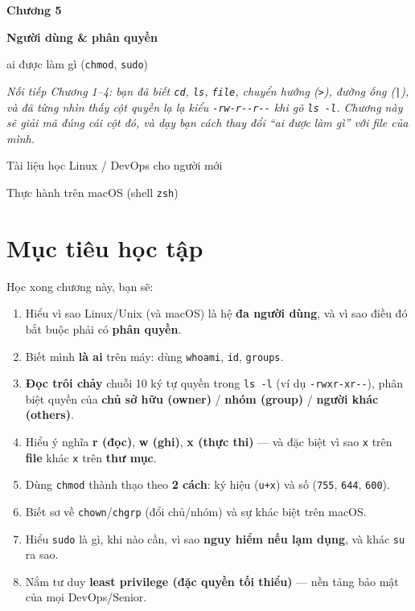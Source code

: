 \documentclass[12pt,a4paper]{article}
\newcommand{\cmd}[1]{\texttt{#1}}
\begin{document}
\begin{titlepage}
\centering
\vspace*{3cm}
{\Huge\bfseries\color{labcolor!80!black} Chương 5\par}
\vspace{1cm}
{\LARGE\bfseries Người dùng \& phân quyền\par}
\vspace{0.4cm}
{\Large ai được làm gì (\texttt{chmod}, \texttt{sudo})\par}
\vspace{2cm}
\begin{tcolorbox}[colback=labbg,colframe=labcolor,width=0.85\textwidth,arc=3mm,boxrule=0.8pt]
\itshape
Nối tiếp Chương 1--4: bạn đã biết \cmd{cd}, \cmd{ls}, \cmd{file}, chuyển hướng
(\cmd{>}), đường ống (\cmd{|}), và đã từng nhìn thấy cột quyền lạ lạ kiểu
\cmd{-rw-r-{}-r-{}-} khi gõ \cmd{ls -l}. Chương này sẽ giải mã đúng cái cột đó,
và dạy bạn cách thay đổi ``ai được làm gì'' với file của mình.
\end{tcolorbox}
\vfill
{\large Tài liệu học Linux / DevOps cho người mới\par}
\vspace{0.5cm}
{\small Thực hành trên macOS (shell \texttt{zsh})\par}
\end{titlepage}

\tableofcontents
\newpage

\section{Mục tiêu học tập}

Học xong chương này, bạn sẽ:

\begin{enumerate}
\item Hiểu vì sao Linux/Unix (và macOS) là hệ \textbf{đa người dùng}, và vì sao
  điều đó bắt buộc phải có \textbf{phân quyền}.
\item Biết mình \textbf{là ai} trên máy: dùng \cmd{whoami}, \cmd{id}, \cmd{groups}.
\item \textbf{Đọc trôi chảy} chuỗi 10 ký tự quyền trong \cmd{ls -l} (ví dụ
  \cmd{-rwxr-xr-{}-}), phân biệt quyền của \textbf{chủ sở hữu (owner)} /
  \textbf{nhóm (group)} / \textbf{người khác (others)}.
\item Hiểu ý nghĩa \textbf{r (đọc)}, \textbf{w (ghi)}, \textbf{x (thực thi)} --- và
  đặc biệt vì sao \cmd{x} trên \textbf{file} khác \cmd{x} trên \textbf{thư mục}.
\item Dùng \cmd{chmod} thành thạo theo \textbf{2 cách}: ký hiệu (\cmd{u+x}) và số
  (\cmd{755}, \cmd{644}, \cmd{600}).
\item Biết sơ về \cmd{chown}/\cmd{chgrp} (đổi chủ/nhóm) và sự khác biệt trên macOS.
\item Hiểu \cmd{sudo} là gì, khi nào cần, vì sao \textbf{nguy hiểm nếu lạm dụng},
  và khác \cmd{su} ra sao.
\item Nắm tư duy \textbf{least privilege (đặc quyền tối thiểu)} --- nền tảng bảo
  mật của mọi DevOps/Senior.
\end{enumerate}
\end{document}
